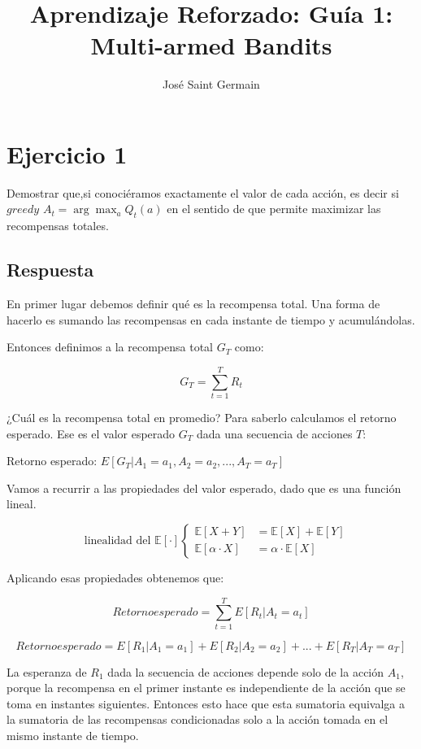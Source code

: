 \documentclass[12pt,a4paper]{article}
\title{Aprendizaje Reforzado: Guía 1: Multi-armed Bandits}
\author{José Saint Germain}
\begin{document}
\maketitle

\section{Ejercicio 1}

Demostrar que,si conociéramos exactamente el valor de cada acción, es decir 
si $greedy$ $A_t = \arg\max_a Q_t(a)$ en el sentido de que permite 
maximizar las recompensas totales.

\subsection{Respuesta}

En primer lugar debemos definir qué es la recompensa total. Una forma
de hacerlo es sumando las recompensas en cada instante de tiempo y 
acumulándolas.

Entonces definimos a la recompensa total $G_T$ como:

$$G_T = \sum_{t=1}^T R_t$$

¿Cuál es la recompensa total en promedio? Para saberlo
calculamos el retorno esperado. Ese es el valor esperado
$G_T$ dada una secuencia de acciones $T$:

Retorno esperado: $E[G_T | A_1=a_1, A_2=a_2, ..., A_T=a_T]$

Vamos a recurrir a las propiedades del valor esperado,
dado que es una función lineal.

$$ \quad \text{linealidad del } \mathbb{E}[\cdot] \left\{
\begin{aligned}
\mathbb{E}[X + Y] &= \mathbb{E}[X] + \mathbb{E}[Y] \\
\mathbb{E}[\alpha \cdot X] &= \alpha \cdot \mathbb{E}[X]
\end{aligned}
\right.$$

Aplicando esas propiedades obtenemos que:

$$ Retorno esperado = \sum_{t=1}^T E[R_t | A_t=a_t] $$

$$ Retorno esperado = E[R_1|A_1=a_1] + E[R_2|A_2=a_2] + ... + E[R_T|A_T=a_T] $$

La esperanza de $R_1$ dada la secuencia de acciones depende solo de la acción $A_1$,
porque la recompensa en el primer instante es independiente de la acción que se toma
en instantes siguientes. Entonces esto hace que esta sumatoria
equivalga a la sumatoria de las recompensas condicionadas solo
a la acción tomada en el mismo instante de tiempo.
\end{document}
